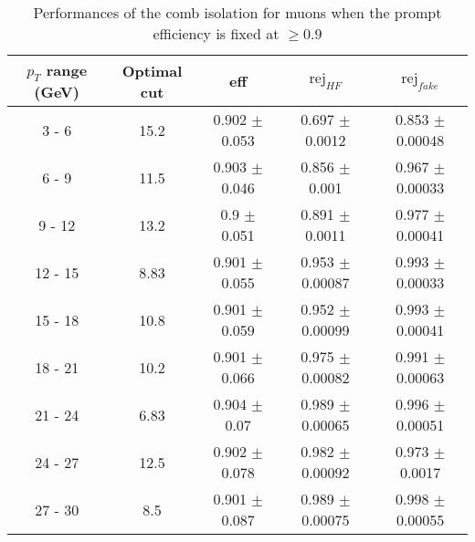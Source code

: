\begin{table}[htbp]
   \centering
   \begin{tabular}{|c|c|c|c|c|}
      \hline
      $p_T$ range (GeV) & Optimal cut & eff & $\textrm{rej}_{HF}$ & $\textrm{rej}_{fake}$ \\
      \hline
      3 - 6 & 15.2 & 0.902 $\pm$ 0.053 & 0.697 $\pm$ 0.0012 & 0.853 $\pm$ 0.00048 \\
      \hline
      6 - 9 & 11.5 & 0.903 $\pm$ 0.046 & 0.856 $\pm$ 0.001 & 0.967 $\pm$ 0.00033 \\
      \hline
      9 - 12 & 13.2 & 0.9 $\pm$ 0.051 & 0.891 $\pm$ 0.0011 & 0.977 $\pm$ 0.00041 \\
      \hline
      12 - 15 & 8.83 & 0.901 $\pm$ 0.055 & 0.953 $\pm$ 0.00087 & 0.993 $\pm$ 0.00033 \\
      \hline
      15 - 18 & 10.8 & 0.901 $\pm$ 0.059 & 0.952 $\pm$ 0.00099 & 0.993 $\pm$ 0.00041 \\
      \hline
      18 - 21 & 10.2 & 0.901 $\pm$ 0.066 & 0.975 $\pm$ 0.00082 & 0.991 $\pm$ 0.00063 \\
      \hline
      21 - 24 & 6.83 & 0.904 $\pm$ 0.07 & 0.989 $\pm$ 0.00065 & 0.996 $\pm$ 0.00051 \\
      \hline
      24 - 27 & 12.5 & 0.902 $\pm$ 0.078 & 0.982 $\pm$ 0.00092 & 0.973 $\pm$ 0.0017 \\
      \hline
      27 - 30 & 8.5 & 0.901 $\pm$ 0.087 & 0.989 $\pm$ 0.00075 & 0.998 $\pm$ 0.00055 \\
      \hline
   \end{tabular}
   \caption{\small{Performances of the comb isolation for muons when the prompt efficiency is fixed at $\geq 0.9$}\label{tab:comb_muon_eff}}
\end{table}